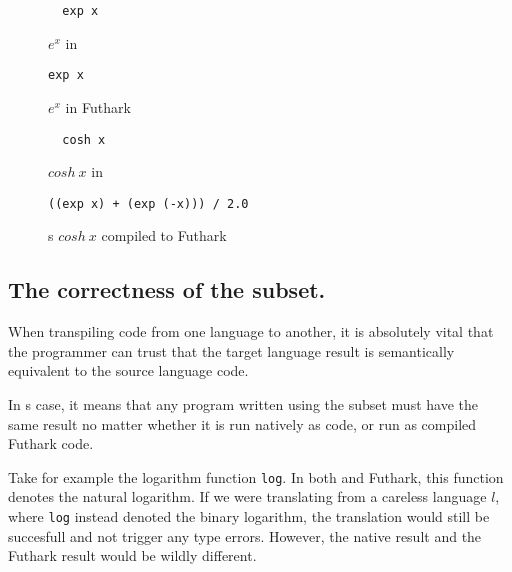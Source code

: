 \clearpage

\begin{figure}[H]
  \centering
\begin{verbatim}
  exp x
\end{verbatim}
  \caption{$e^x$ in \fsharp{}}
  \label{fig:fsharkexp}
\end{figure}

\begin{figure}[H]
  \centering
\begin{lstlisting}[language=Futhark]
  exp x
\end{lstlisting}
  \caption{$e^x$ in Futhark}
  \label{fig:futharkexp}
\end{figure}

\begin{figure}[H]
  \centering
\begin{verbatim}
  cosh x
\end{verbatim}
  \caption{$cosh~ x$ in \fsharp{}}
  \label{fig:fsharkcosh}
\end{figure}
\begin{figure}[H]
  \centering
\begin{lstlisting}[language=Futhark]
  ((exp x) + (exp (-x))) / 2.0
\end{lstlisting}
\caption{\fshark{}s $cosh~ x$ compiled to Futhark}
  \label{fig:futharkcosh}
\end{figure}

\clearpage
\subsection*{The correctness of the \fshark{} subset.}
When transpiling code from one language to another, it is absolutely vital that
the programmer can trust that the target language result
is semantically equivalent to the source language code.

In \fshark{}s case, it means that any program written using the \fshark{}
subset must have the same result no matter whether it is run natively as
\fsharp{} code, or run as \fshark{} compiled Futhark code.

Take for example the logarithm function \texttt{log}. In both \fsharp{} and
Futhark, this function denotes the natural logarithm. If we were translating
from a careless language $l$, where \texttt{log} instead denoted the binary
logarithm, the translation would still be succesfull and not trigger any type
errors.
However, the native result and the Futhark result would be wildly different.

